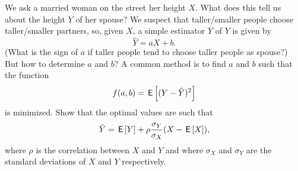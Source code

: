

\begin{exercise}
We ask a married woman on the street her height $X$.
What does this tell us about the height $Y$ of her spouse?
We suspect that taller/smaller people choose taller/smaller partners, so, given $X$, a simple estimator $\hat Y$ of $Y$ is given by
\begin{equation*}
  \hat Y = a X + b.
\end{equation*}
(What is the sign of $a$ if taller people tend to choose taller people as spouse?)
But how to determine $a$ and $b$? A common method is to find $a$ and $b$ such that the function
\begin{equation*}
  f(a,b) = \,\mathsf{E}\left[(Y-\hat Y)^2\right]
\end{equation*}
is minimized. Show that the optimal values are such that
\begin{align*}
  \hat Y = \,\mathsf{E}\left[Y\right] + \rho \frac{\sigma_Y}{\sigma_X} (X - \,\mathsf{E}\left[X\right]),
\end{align*}
where $\rho$ is the correlation between $X$ and $Y$ and where $\sigma_X$ and $\sigma_Y$ are the standard deviations of $X$ and $Y$ respectively.


\end{exercise}
